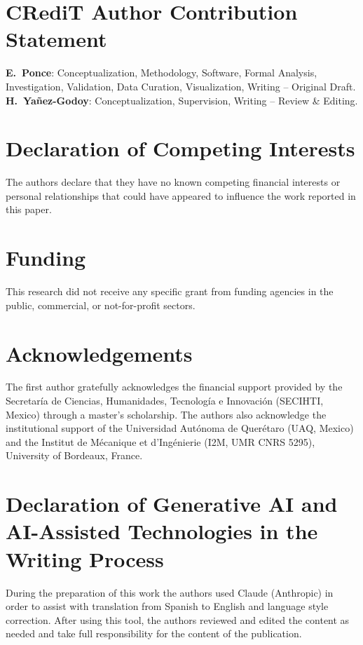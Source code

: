 \documentclass[preprint,12pt,authoryear]{elsarticle}
\begin{document}
\section*{CRediT Author Contribution Statement}

\textbf{E.~Ponce}: Conceptualization, Methodology, Software, Formal Analysis,
Investigation, Validation, Data Curation, Visualization, Writing -- Original Draft.
\textbf{H.~Yañez-Godoy}: Conceptualization, Supervision, Writing -- Review \& Editing.

\section*{Declaration of Competing Interests}

The authors declare that they have no known competing financial interests or
personal relationships that could have appeared to influence the work reported
in this paper.

\section*{Funding}

This research did not receive any specific grant from funding agencies in the
public, commercial, or not-for-profit sectors.

\section*{Acknowledgements}

The first author gratefully acknowledges the financial support provided by the
Secretaría de Ciencias, Humanidades, Tecnología e Innovación (SECIHTI, Mexico)
through a master's scholarship. The authors also acknowledge the institutional
support of the Universidad Autónoma de Querétaro (UAQ, Mexico) and the Institut
de Mécanique et d'Ingénierie (I2M, UMR CNRS 5295), University of Bordeaux,
France.

\section*{Declaration of Generative AI and AI-Assisted Technologies in the
Writing Process}

During the preparation of this work the authors used Claude (Anthropic) in order
to assist with translation from Spanish to English and language style correction.
After using this tool, the authors reviewed and edited the content as needed and
take full responsibility for the content of the publication.



\end{document}
